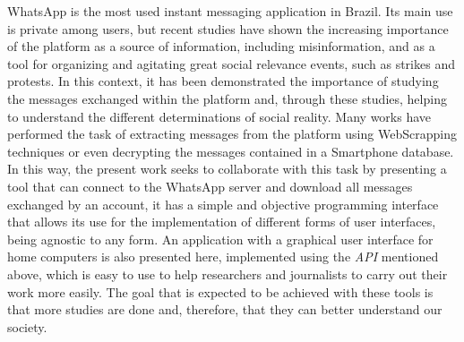 WhatsApp is the most used instant messaging application in Brazil. Its main use is private among users, but recent studies have shown the increasing importance of the platform as a source of information, including misinformation, and as a tool for organizing and agitating great social relevance events, such as strikes and protests. In this context, it has been demonstrated the importance of studying the messages exchanged within the platform and, through these studies, helping to understand the different determinations of social reality. Many works have performed the task of extracting messages from the platform using WebScrapping techniques or even decrypting the messages contained in a Smartphone database. In this way, the present work seeks to collaborate with this task by presenting a tool that can connect to the WhatsApp server and download all messages exchanged by an account, it has a simple and objective programming interface that allows its use for the implementation of different forms of user interfaces, being agnostic to any form. An application with a graphical user interface for home computers is also presented here, implemented using the \textit{API} mentioned above, which is easy to use to help researchers and journalists to carry out their work more easily. The goal that is expected to be achieved with these tools is that more studies are done and, therefore, that they can better understand our society. 

